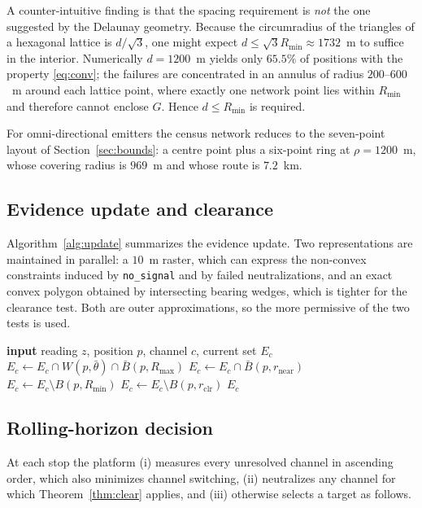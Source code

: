 \documentclass[journal,10pt]{IEEEtran}
\theoremstyle{definition}
\newcommand{\Rmin}{R_{\min}}
\newcommand{\Rmax}{R_{\max}}
\begin{document}
A counter-intuitive finding is that the spacing requirement is \emph{not} the one suggested by the
Delaunay geometry. Because the circumradius of the triangles of a hexagonal lattice is
$d/\sqrt3$, one might expect $d\le\sqrt3\Rmin\approx1732$~m to suffice in the interior. Numerically
$d=1200$~m yields only $65.5\%$ of positions with the property \eqref{eq:conv}; the failures are
concentrated in an annulus of radius $200$--$600$~m around each lattice point, where exactly one
network point lies within $\Rmin$ and therefore cannot enclose $G$. Hence $d\le\Rmin$ is required.

For omni-directional emitters the census network reduces to the seven-point layout of
Section~\ref{sec:bounds}: a centre point plus a six-point ring at $\rho=1200$~m, whose covering
radius is $969$~m and whose route is $7.2$~km.

\subsection{Evidence update and clearance}
Algorithm~\ref{alg:update} summarizes the evidence update. Two representations are maintained in
parallel: a $10$~m raster, which can express the non-convex constraints induced by
\texttt{no\_signal} and by failed neutralizations, and an exact convex polygon obtained by
intersecting bearing wedges, which is tighter for the clearance test. Both are outer
approximations, so the more permissive of the two tests is used.

\begin{algorithm}[t]
\caption{Evidence update for channel $c$}
\label{alg:update}
\begin{algorithmic}[1]
\State \textbf{input} reading $z$, position $p$, channel $c$, current set $E_c$
    \State $E_c \gets E_c\cap W(p,\bar\theta)\cap \bar B(p,\Rmax)$
    \State $E_c \gets E_c\cap \bar B(p,r_{\mathrm{near}})$
    \State $E_c \gets E_c\setminus B(p,\Rmin)$
    \State $E_c \gets E_c\setminus B(p,r_{\mathrm{clr}})$
\EndIf
\State \Return $E_c$
\end{algorithmic}
\end{algorithm}

\subsection{Rolling-horizon decision}
At each stop the platform (i) measures every unresolved channel in ascending order, which also
minimizes channel switching, (ii) neutralizes any channel for which
Theorem~\ref{thm:clear} applies, and (iii) otherwise selects a target as follows.
\end{document}
